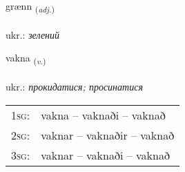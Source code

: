 \documentclass[frontgrid, backgrid]{flacards}\usepackage[]{graphicx}\usepackage[]{xcolor}
\begin{document}
\renewcommand{\flhead}{\vskip5pt \fboxsep=0pt {\small\bfseries\footnotesize Lýsingarorð | прикметник}}
\renewcommand{\fcfoot}{\vskip5pt \fboxsep=0pt \hspace{2pt}{\small\bfseries\footnotesize 2K}}

\renewcommand{\blhead}{\vskip5pt {\small\bfseries\footnotesize Lýsingarorð | прикметник }}
\renewcommand{\bcfoot}{\vskip5pt \hspace{2pt}{\small\bfseries\footnotesize 2K}}


{grænn \small{\textsubscript{(\textit{adj.})}} \\[1ex] %
\textphonetic{[kraitn̥]} \\
ukr.: \emph{зелений} \\  [2ex]
\renewcommand*{\arraystretch}{0.8}
}

\renewcommand{\flhead}{\vskip5pt \fboxsep=0pt {\small\bfseries\footnotesize Sagnorð | дієслово}}
\renewcommand{\fcfoot}{\vskip5pt \fboxsep=0pt \hspace{2pt}{\small\bfseries\footnotesize 2K}}

\renewcommand{\blhead}{\vskip5pt {\small\bfseries\footnotesize Sagnorð | дієслово }}
\renewcommand{\bcfoot}{\vskip5pt \hspace{2pt}{\small\bfseries\footnotesize 2K}}


{vakna \small{\textsubscript{(\textit{v.})}} \\[1ex] %
\textphonetic{[vahkna]} \\
ukr.: \emph{прокидатися; просинатися} \\  [2ex]
\renewcommand*{\arraystretch}{0.8}
\begin{tabular}{p{1cm}l}
\textsc{1sg}: & vakna -- vaknaði -- vaknað \\ 
\textsc{2sg}: & vaknar -- vaknaðir -- vaknað \\ 
\textsc{3sg}: & vaknar -- vaknaði -- vaknað \\ 
\end{tabular}
}
\end{document}

